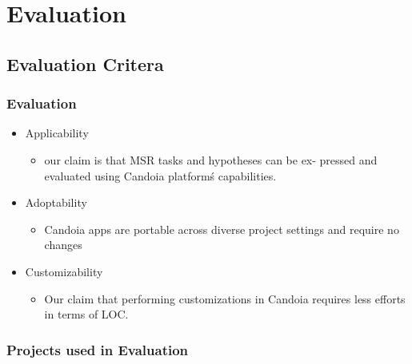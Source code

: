     \section{Evaluation}
    \subsection{Evaluation Critera}
        \begin{frame}
            \frametitle{Evaluation}
            \begin{itemize}
                \item Applicability
                    \begin{itemize}
                        \item our claim is that MSR tasks and hypotheses can be ex- pressed and evaluated using Candoia platform\'s capabilities.
                    \end{itemize}
                \item Adoptability
                    \begin{itemize}
                        \item Candoia apps are portable across diverse project settings and require no changes
                    \end{itemize}
                \item Customizability
                    \begin{itemize}
                        \item Our claim that performing customizations in Candoia requires less efforts in terms of LOC.
                    \end{itemize}
            \end{itemize}
         \end{frame}

        \begin{frame}
            \frametitle{Projects used in Evaluation}
            
         \end{frame}

